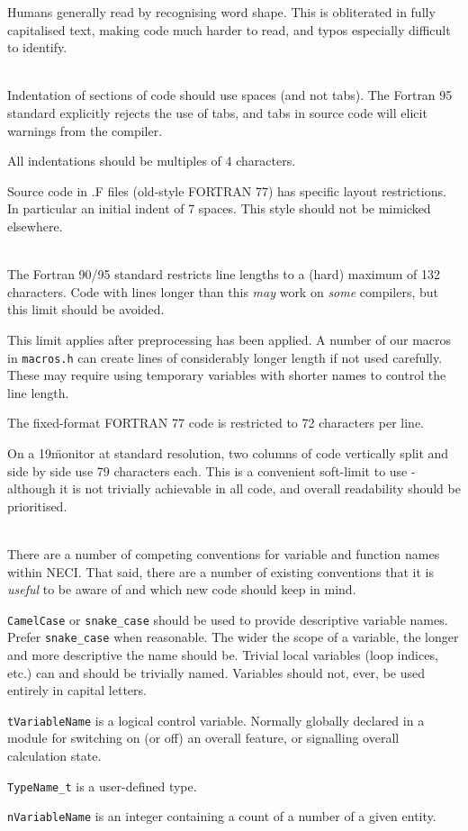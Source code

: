 \documentclass[a4paper,notitlepage,dvipsnames]{scrreprt}
\newenvironment{packed_itemize}{
	\begin{itemize}
		\setlength{\itemsep}{1pt}
		\setlength{\parskip}{0pt}
		\setlength{\parsep}{0pt}
	}{\end{itemize}}
\newcommand\headitem[1]{\needspace{1.5\baselineskip}\item[{\boldmath #1 \nopagebreak}] \hfill \\ \nopagebreak}
\let\code\lstinline
\begin{document}
\begin{description}
		Humans generally read by recognising word shape. This is obliterated
		in fully capitalised text, making code much harder to read, and typos
		especially difficult to identify.

	\headitem{Indentation}
		Indentation of sections of code should use spaces (and not tabs). The
		Fortran 95 standard explicitly rejects the use of tabs, and tabs in
		source code will elicit warnings from the compiler.

		All indentations should be multiples of 4 characters.

		Source code in \textasteriskcentered.F files (old-style FORTRAN 77)
		has specific layout restrictions. In particular an initial indent of
		7 spaces. This style should not be mimicked elsewhere.

	\headitem{Code line length}
		The Fortran 90/95 standard restricts line lengths to a (hard) maximum
		of 132 characters. Code with lines longer than this \emph{may} work
		on \emph{some} compilers, but this limit should be avoided.

		This limit applies after preprocessing has been applied. A number of
		our macros in \code{macros.h} can create lines of considerably
		longer length if not used carefully. These may require using temporary
		variables with shorter names to control the line length.

		The fixed-format FORTRAN 77 code is restricted to 72 characters per
		line.

		On a 19\" monitor at standard resolution, two columns of code
		vertically split and side by side use 79 characters each. This is a
		convenient soft-limit to use - although it is not trivially achievable
		in all code, and overall readability should be prioritised.

	\headitem{Variable name conventions}
		There are a number of competing conventions for variable and function
		names within NECI. That said, there are a number of existing conventions that it is \emph{useful} to be
		aware of and which new code should keep in mind.
		\begin{packed_itemize}
			\item
				\code{CamelCase} or \code{snake_case} should be used
				to provide descriptive variable names. Prefer
                \code{snake_case} when reasonable. The wider the scope of
				a variable, the longer and more descriptive the name should be.
				Trivial local variables (loop indices, etc.) can and should be
				trivially named. Variables should not, ever, be used entirely
				in capital letters.
			\item
				\code{tVariableName} is a logical control variable.
				Normally globally declared in a module for switching on (or
				off) an overall feature, or signalling overall calculation
				state.
                        \item
                                \code{TypeName_t} is a user-defined type.
			\item
				\code{nVariableName} is an integer containing a count of
				a number of a given entity.


\end{packed_itemize}
\end{description}
\end{document}
